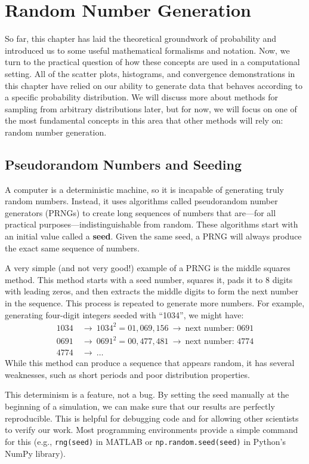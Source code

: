 \section{Random Number Generation}
So far, this chapter has laid the theoretical groundwork of probability and introduced us to some useful mathematical formalisms and notation. Now, we turn to the practical question of how these concepts are used in a computational setting. All of the scatter plots, histograms, and convergence demonstrations in this chapter have relied on our ability to generate data that behaves according to a specific probability distribution. We will discuss more about methods for sampling from arbitrary distributions later, but for now, we will focus on one of the most fundamental concepts in this area that other methods will rely on: random number generation.

\subsection{Pseudorandom Numbers and Seeding}
A computer is a deterministic machine, so it is incapable of generating truly random numbers. Instead, it uses algorithms called pseudorandom number generators (PRNGs) to create long sequences of numbers that are---for all practical purposes---indistinguishable from random. These algorithms start with an initial value called a \textbf{seed}. Given the same seed, a PRNG will always produce the exact same sequence of numbers.

A very simple (and not very good!) example of a PRNG is the middle squares method. This method starts with a seed number, squares it, pads it to 8 digits with leading zeros, and then extracts the middle digits to form the next number in the sequence. This process is repeated to generate more numbers. For example, generating four-digit integers seeded with ``1034'', we might have:
\begin{align*}
1034 &~\rightarrow~ 1034^2 = 01,069,156 ~\rightarrow~ \text{next number: } 0691 \\
0691 &~\rightarrow~ 0691^2 = 00,477,481  ~\rightarrow~ \text{next number: } 4774 \\
4774 &~\rightarrow~ \ldots
\end{align*}
While this method can produce a sequence that appears random, it has several weaknesses, such as short periods and poor distribution properties.

This determinism is a feature, not a bug. By setting the seed manually at the beginning of a simulation, we can make sure that our results are perfectly reproducible. This is helpful for debugging code and for allowing other scientists to verify our work. Most programming environments provide a simple command for this (e.g., \texttt{rng(seed)} in MATLAB or \texttt{np.random.seed(seed)} in Python's NumPy library).

